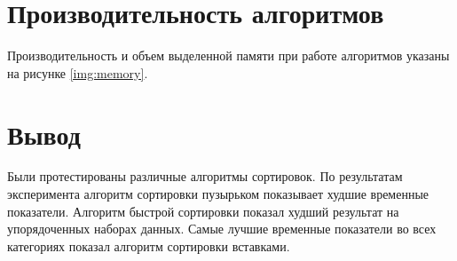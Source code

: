 \newpage
\section{Производительность алгоритмов}

Производительность и объем выделенной памяти при работе алгоритмов указаны на рисунке \ref{img:memory}.


\section*{Вывод}

Были протестированы различные алгоритмы сортировок. По результатам эксперимента алгоритм сортировки пузырьком показывает худшие временные показатели. Алгоритм быстрой сортировки показал худший результат на упорядоченных наборах данных. Самые лучшие временные показатели во всех категориях показал алгоритм сортировки вставками.